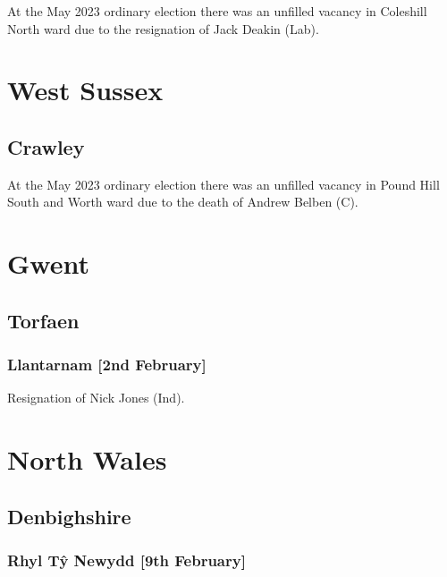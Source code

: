 \documentclass[a4paper,openany]{book}
\begin{document}
\begin{resultsiii}
At the May 2023 ordinary election there was an unfilled vacancy in Coleshill North ward due to the resignation of Jack Deakin (Lab).%

\section{West Sussex}

\subsection*{Crawley}

At the May 2023 ordinary election there was an unfilled vacancy in Pound Hill South and Worth ward due to the death of Andrew Belben (C).%

\section{Gwent}

\subsection*{Torfaen}

\subsubsection*{Llantarnam \hspace*{\fill}\nolinebreak[1]%
	\enspace\hspace*{\fill}
	[2nd February]}


Resignation of Nick Jones (Ind).

\section{North Wales}

\subsection*{Denbighshire}

\subsubsection*{Rhyl Tŷ Newydd \hspace*{\fill}\nolinebreak[1]%
	\enspace\hspace*{\fill}
	[9th February]}


\end{resultsiii}
\end{document}
